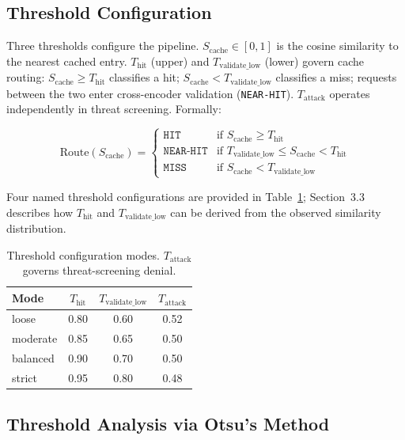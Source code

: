 \documentclass[runningheads]{llncs}
\begin{document}
\subsection{Threshold Configuration}
Three thresholds configure the pipeline. $S_{\text{cache}} \in [0,1]$ is the cosine similarity to the nearest cached entry. $T_{\text{hit}}$ (upper) and $T_{\text{validate\_low}}$ (lower) govern cache routing: $S_{\text{cache}} \geq T_{\text{hit}}$ classifies a hit; $S_{\text{cache}} < T_{\text{validate\_low}}$ classifies a miss; requests between the two enter cross-encoder validation (\texttt{NEAR-HIT}). $T_{\text{attack}}$ operates independently in threat screening. Formally:

\[
\text{Route}(S_{\text{cache}}) = \begin{cases}
\texttt{HIT}      & \text{if } S_{\text{cache}} \geq T_{\text{hit}} \\
\texttt{NEAR-HIT} & \text{if } T_{\text{validate\_low}} \leq S_{\text{cache}} < T_{\text{hit}} \\
\texttt{MISS}     & \text{if } S_{\text{cache}} < T_{\text{validate\_low}}
\end{cases}
\]

\noindent Four named threshold configurations are provided in Table~\ref{tab:modes}; Section~3.3 describes how $T_{\text{hit}}$ and $T_{\text{validate\_low}}$ can be derived from the observed similarity distribution.

\begin{table}[t]
\caption{Threshold configuration modes. $T_{\text{attack}}$ governs threat-screening denial.}
\label{tab:modes}
\centering
\renewcommand{\arraystretch}{1}
\begin{tabular}{lccc}
\toprule
Mode & $T_{\text{hit}}$ & $T_{\text{validate\_low}}$ & $T_{\text{attack}}$ \\
\midrule
loose        & 0.80 & 0.60 & 0.52 \\
moderate     & 0.85 & 0.65 & 0.50 \\
balanced     & 0.90 & 0.70 & 0.50 \\
strict       & 0.95 & 0.80 & 0.48 \\
\bottomrule
\end{tabular}
\end{table}

\subsection{Threshold Analysis via Otsu's Method}
\end{document}
